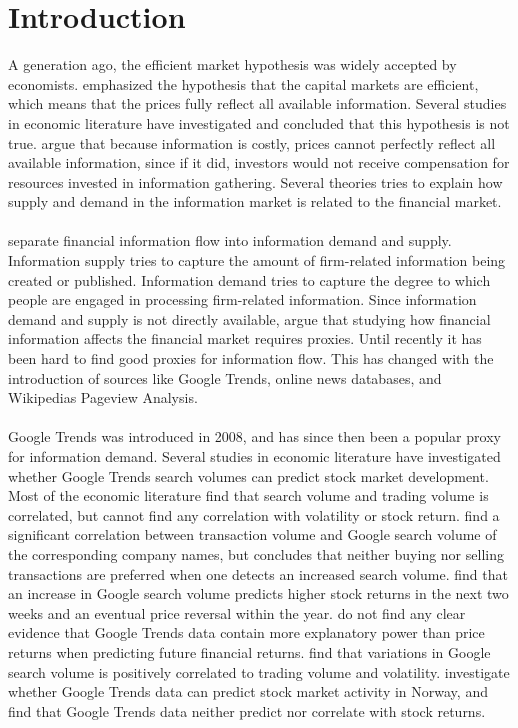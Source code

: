 
\chapter{Introduction}

A generation ago, the efficient market hypothesis was widely accepted by economists. \cite{fama} emphasized the hypothesis that the capital markets are efficient, which means that the prices fully reflect all available information. Several studies in economic literature have investigated and concluded that this hypothesis is not true. \cite{grossman} argue that because information is costly, prices cannot perfectly reflect all available information, since if it did, investors would  not receive compensation for resources invested in information gathering. Several theories tries to explain how supply and demand in the information market is related to the financial market. 
\\\\
\cite{vlastakis} separate financial information flow into information demand and supply. Information supply tries to capture the amount of firm-related information being created or published. Information demand tries to capture the degree to which people are engaged in processing firm-related information. Since information demand and supply is not directly available, \cite{vlastakis} argue that studying how financial information affects the financial market requires proxies. Until recently it has been hard to find good proxies for information flow. This has changed with the introduction of sources like Google Trends, online news databases, and Wikipedias Pageview Analysis.  
\\\\
Google Trends was introduced in 2008, and has since then been a popular proxy for information demand. Several studies in economic literature have investigated whether Google Trends search volumes can predict stock market development. Most of the economic literature find that search volume and trading volume is correlated, but cannot find any correlation with volatility or stock return. \cite{preis} find a significant correlation between transaction volume and Google search volume of the corresponding company names, but concludes that neither buying nor selling transactions are preferred when one detects an increased search volume. \cite{engelberg} find that an increase in Google search volume predicts higher stock returns in the next two weeks and an eventual price reversal within the year. \cite{challet2014} do not find any clear evidence that Google Trends data contain more explanatory power than price returns when predicting future financial returns. \cite{vlastakis} find that variations in Google search volume is positively correlated to trading volume and volatility. \cite{neri} investigate whether Google Trends data can predict stock market activity in Norway, and find that Google Trends data neither predict nor correlate with stock returns. 
